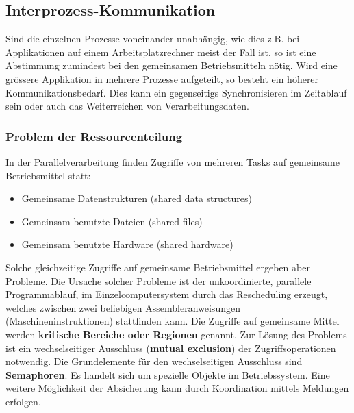 \subsection{Interprozess-Kommunikation}
Sind die einzelnen Prozesse voneinander unabhängig, wie dies z.B. bei Applikationen
auf einem Arbeitsplatzrechner meist der Fall ist, so ist eine Abstimmung
zumindest bei den gemeinsamen Betriebsmitteln nötig. Wird eine grössere Applikation in mehrere Prozesse aufgeteilt, so besteht ein höherer
Kommunikationsbedarf. Dies kann ein gegenseitigs Synchronisieren im Zeitablauf
sein oder auch das Weiterreichen von Verarbeitungsdaten.

\subsubsection{Problem der Ressourcenteilung}
In der Parallelverarbeitung finden Zugriffe von mehreren Tasks auf gemeinsame
Betriebsmittel statt:
\begin{itemize}
    \item Gemeinsame Datenstrukturen (shared data structures)
    \item Gemeinsam benutzte Dateien (shared files)
    \item Gemeinsam benutzte Hardware (shared hardware)
\end{itemize}
Solche gleichzeitige Zugriffe auf gemeinsame Betriebsmittel ergeben aber Probleme. Die Ursache solcher Probleme ist der unkoordinierte, parallele Programmablauf, im Einzelcomputersystem durch das Rescheduling erzeugt, welches
zwischen zwei beliebigen Assembleranweisungen (Maschineninstruktionen) stattfinden kann. Die Zugriffe auf gemeinsame Mittel werden \textbf{kritische Bereiche oder Regionen}
genannt. Zur Lösung des Problems ist ein wechselseitiger Ausschluss (\textbf{mutual exclusion})
der Zugriffsoperationen notwendig.
Die Grundelemente für den wechselseitigen Ausschluss sind \textbf{Semaphoren}. Es handelt sich um spezielle Objekte im Betriebssystem.
Eine weitere Möglichkeit der Absicherung kann durch Koordination mittels
Meldungen erfolgen.


